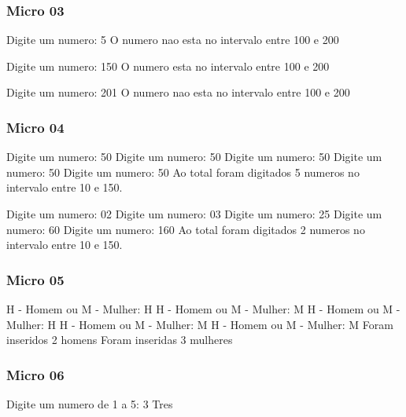 \documentclass[12pt,a4paper,twoside]{report}
\begin{document}
\subsubsection{Micro 03}


\begin{terminal}
Digite um numero: 5
O numero nao esta no intervalo entre 100 e 200

Digite um numero: 150
O numero esta no intervalo entre 100 e 200

Digite um numero: 201
O numero nao esta no intervalo entre 100 e 200
\end{terminal}

\subsubsection{Micro 04}


\begin{terminal}
Digite um numero: 50
Digite um numero: 50
Digite um numero: 50
Digite um numero: 50
Digite um numero: 50
Ao total foram digitados 5 numeros no intervalo entre 10 e 150.

Digite um numero: 02
Digite um numero: 03
Digite um numero: 25
Digite um numero: 60
Digite um numero: 160
Ao total foram digitados 2 numeros no intervalo entre 10 e 150.
\end{terminal}

\subsubsection{Micro 05}


\begin{terminal}
H - Homem ou M - Mulher: H
H - Homem ou M - Mulher: M
H - Homem ou M - Mulher: H
H - Homem ou M - Mulher: M
H - Homem ou M - Mulher: M
Foram inseridos 2 homens
Foram inseridas 3 mulheres
\end{terminal}

\subsubsection{Micro 06}


\begin{terminal}
Digite um numero de 1 a 5: 3
Tres
\end{terminal}
\end{document}
